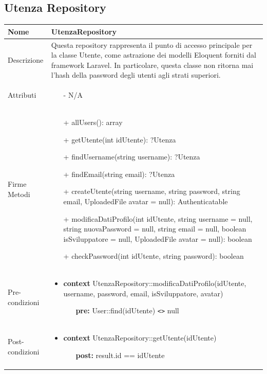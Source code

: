 \subsection{Utenza Repository}
\small\begin{tabular}{|| l | p{34em} ||} 
	\hline
	Nome & UtenzaRepository\\
	\hline
	Descrizione & Questa repository rappresenta il punto di accesso principale per la classe Utente, come astrazione dei modelli Eloquent forniti dal framework Laravel. In particolare, questa classe non ritorna mai l'hash della password degli utenti agli strati superiori.\\
	\hline
	Attributi & \begin{itemize}
		\item[-] N/A
	\end{itemize}\\
	\hline
	Firme Metodi & \begin{itemize}
		\item[+] allUsers(): array
		\item[+] getUtente(int idUtente): ?Utenza
		\item[+] findUsername(string username): ?Utenza
		\item[+] findEmail(string email): ?Utenza
		\item[+] createUtente(string username, string password, string email, UploadedFile avatar = null): Authenticatable
		\item[+] modificaDatiProfilo(int idUtente, string username = null, string nuovaPassword = null, string email = null, boolean isSviluppatore = null, UploadedFile avatar = null): boolean
		\item[+] checkPassword(int idUtente, string password): boolean    
	\end{itemize}\\
	\hline
Pre-condizioni & \begin{itemize}[leftmargin=*]
	\item \textbf{context} UtenzaRepository::modificaDatiProfilo(idUtente, username, password, email, isSviluppatore, avatar)
	\begin{itemize}
		\item[ ] \textbf{pre:} User::find(idUtente) \verb|<>| null
	\end{itemize}
\end{itemize}\\
\hline
Post-condizioni & \begin{itemize}[leftmargin=*]
	\item \textbf{context} UtenzaRepository::getUtente(idUtente)
	\begin{itemize}
		\item[ ] \textbf{post:} result.id == idUtente
	\end{itemize}


\end{itemize}
\end{tabular}
